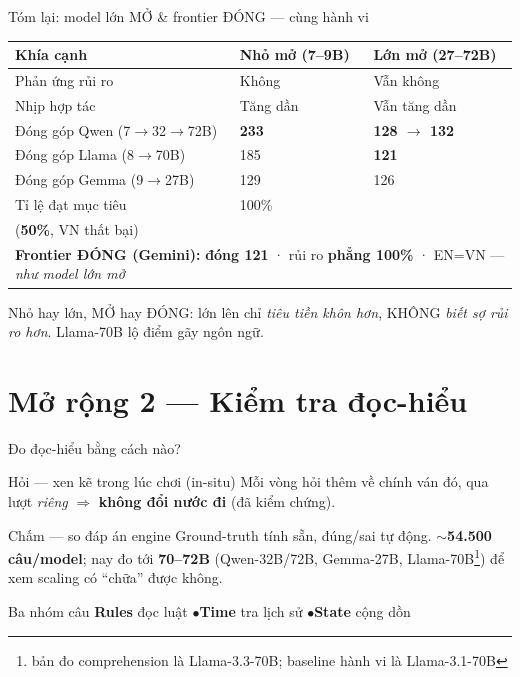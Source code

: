 \documentclass[aspectratio=169,10pt]{beamer}
\newcommand{\good}[1]{\textcolor{green!45!black}{\textbf{#1}}}   %
\newcommand{\weak}[1]{\textcolor{red!70!black}{\textbf{#1}}}     %
\newcommand{\take}[1]{\vfill{\footnotesize\textcolor{green!45!black}{#1}}}
\begin{document}
\begin{frame}{Tóm lại: model lớn MỞ \& frontier ĐÓNG --- cùng hành vi}
  \centering
  \setlength{\tabcolsep}{10pt}\renewcommand{\arraystretch}{1.3}
  \begin{tabular}{lll}
    \toprule
    Khía cạnh & Nhỏ mở (7--9B) & Lớn mở (27--72B) \\
    \midrule
    Phản ứng rủi ro   & Không & \alert{Vẫn không} \\
    Nhịp hợp tác      & Tăng dần & \alert{Vẫn tăng dần} \\
    \rowcolor{hirow} Đóng góp Qwen (7$\to$32$\to$72B) & \weak{233} & \good{128 $\to$ 132} \\
    Đóng góp Llama (8$\to$70B) & 185 & \good{121} \\
    Đóng góp Gemma (9$\to$27B) & 129 & 126 \\
    \rowcolor{hirow} Tỉ lệ đạt mục tiêu & 100\% & \makecell[l]{$\sim$100\% \emph{trừ} Llama-70B\\(\weak{50\%}, VN thất bại)} \\
    \midrule
    \multicolumn{3}{l}{\textbf{Frontier ĐÓNG (Gemini):} \good{đóng 121} · rủi ro \good{phẳng 100\%} · EN=VN --- \emph{như model lớn mở}} \\
    \bottomrule
  \end{tabular}
  \take{Nhỏ hay lớn, MỞ hay ĐÓNG: lớn lên chỉ \emph{tiêu tiền khôn hơn}, KHÔNG \emph{biết sợ rủi ro hơn}. Llama-70B lộ điểm gãy \alert{ngôn ngữ}.}
\end{frame}

\section{Mở rộng 2 --- Kiểm tra đọc-hiểu}

\begin{frame}{Đo đọc-hiểu bằng cách nào?}
  \begin{block}{Hỏi --- xen kẽ trong lúc chơi (in-situ)}
    Mỗi vòng hỏi thêm về chính ván đó, qua lượt \emph{riêng} $\Rightarrow$ \textbf{không đổi nước đi} (đã kiểm chứng).
  \end{block}
  \begin{block}{Chấm --- so đáp án engine}
    Ground-truth tính sẵn, đúng/sai tự động. \textbf{$\sim$54.500 câu/model}; nay đo tới \textbf{70--72B} (Qwen-32B/72B, Gemma-27B, Llama-70B\footnote{\scriptsize bản đo comprehension là Llama-3.3-70B; baseline hành vi là Llama-3.1-70B}) để xem scaling có ``chữa'' được không.
  \end{block}
  \begin{exampleblock}{Ba nhóm câu}
    \textbf{Rules} đọc luật \quad$\bullet$\quad \textbf{Time} tra lịch sử \quad$\bullet$\quad \textbf{State} cộng dồn
  \end{exampleblock}
\end{frame}
\end{document}
